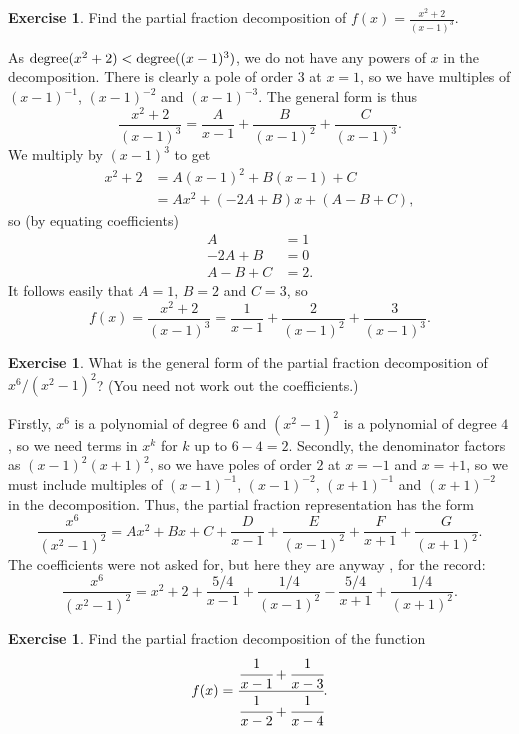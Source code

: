\documentclass[a4paper]{book}
\theoremstyle{definition}
\newtheorem{exercise}[theorem]{Exercise}
\renewenvironment{solution}{\SolutionInline}{\endSolutionInline}
\begin{document}
\begin{exercise}
 Find the partial fraction decomposition of
 $f(x)=\frac{x^2+2}{(x-1)^3}$.
\end{exercise}
\begin{solution}
 As $\operatorname{degree}(x^2+2)<\operatorname{degree}((x-1)^3)$, we do not have any powers of
 $x$ in the decomposition.  There is clearly a pole of order $3$ at
 $x=1$, so we have multiples of $(x-1)^{-1}$, $(x-1)^{-2}$ and
 $(x-1)^{-3}$.  The general form is thus
 \[ \frac{x^2+2}{(x-1)^3} =
     \frac{A}{x-1} + \frac{B}{(x-1)^2} + \frac{C}{(x-1)^3}.
 \]
 We multiply by $(x-1)^3$ to get
 \begin{align*}
  x^2 + 2 &= A(x-1)^2 + B(x-1) + C \\
          &= Ax^2 + (-2A+B)x + (A-B+C),
 \end{align*}
 so (by equating coefficients)
 \begin{align*}
  A &= 1 \\
  -2A+B &= 0 \\
  A-B+C &= 2.
 \end{align*}
 It follows easily that $A=1$, $B=2$ and $C=3$, so
 \[ f(x) = \frac{x^2+2}{(x-1)^3} =
     \frac{1}{x-1} + \frac{2}{(x-1)^2} + \frac{3}{(x-1)^3}.
 \]
\end{solution}
\begin{exercise}
 What is the general form of the partial fraction decomposition of
 $x^6/(x^2-1)^2$?  (You need not work out the coefficients.)
\end{exercise}
\begin{solution}
 Firstly, $x^6$ is a polynomial of degree $6$ and $(x^2-1)^2$ is a
 polynomial of degree $4$, so we need terms in $x^k$ for $k$ up to
 $6-4=2$.  Secondly, the denominator factors as $(x-1)^2(x+1)^2$, so
 we have poles of order $2$ at $x=-1$ and $x=+1$, so we must include
 multiples of $(x-1)^{-1}$, $(x-1)^{-2}$, $(x+1)^{-1}$ and
 $(x+1)^{-2}$ in the decomposition.  Thus, the partial fraction
 representation has the form
 \[ \frac{x^6}{(x^2-1)^2} = 
     Ax^2 + Bx + C + \frac{D}{x-1} + \frac{E}{(x-1)^2} 
                   + \frac{F}{x+1} + \frac{G}{(x+1)^2}. 
 \]
 The coefficients were not asked for, but here they are anyway , for
 the record:
 \[ \frac{x^6}{(x^2-1)^2} = 
     x^2  + 2 + \frac{5/4}{x-1} + \frac{1/4}{(x-1)^2} 
              - \frac{5/4}{x+1} + \frac{1/4}{(x+1)^2}. 
 \]
\end{solution}
\begin{exercise}
 Find the partial fraction decomposition of the function
 \[ f(x) = \cfrac{\cfrac{1}{x-1} + \cfrac{1}{x-3}}
                 {\cfrac{1}{x-2} + \cfrac{1}{x-4}}. \]
\end{exercise}
\end{document}
